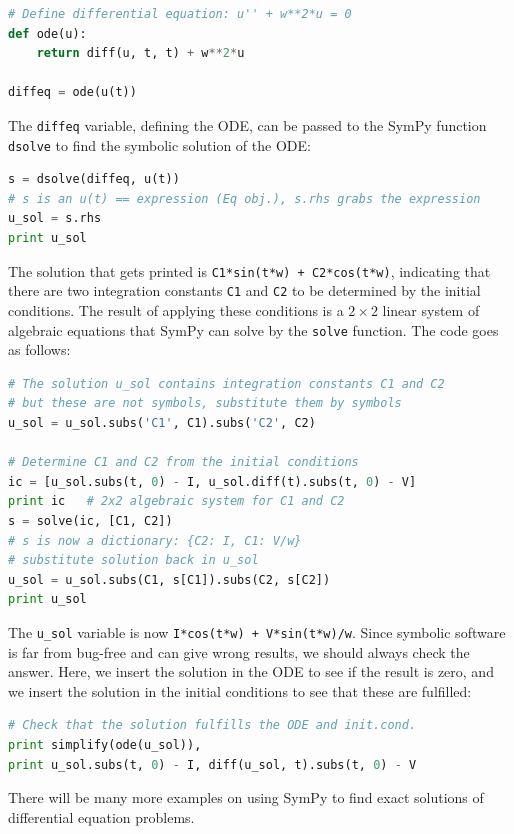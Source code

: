 \documentclass[graybox,envcountchap,sectrefs,final]{svmonodo}
\begin{document}
\begin{lstlisting}[language=Python,style=graycolor]
# Define differential equation: u'' + w**2*u = 0
def ode(u):
    return diff(u, t, t) + w**2*u

diffeq = ode(u(t))
\end{lstlisting}
The \texttt{diffeq} variable, defining the ODE, can be passed to the SymPy
function \texttt{dsolve} to find the symbolic solution of the ODE:

\begin{lstlisting}[language=Python,style=graycolor]
s = dsolve(diffeq, u(t))
# s is an u(t) == expression (Eq obj.), s.rhs grabs the expression
u_sol = s.rhs
print u_sol
\end{lstlisting}
The solution that gets printed is \texttt{C1*sin(t*w) + C2*cos(t*w)}, indicating
that there are two integration constants \texttt{C1} and \texttt{C2} to be determined
by the initial conditions. The result of applying these conditions is
a $2\times 2$ linear system of algebraic equations that SymPy can solve
by the \texttt{solve} function. The code goes as follows:

\begin{lstlisting}[language=Python,style=graycolor]
# The solution u_sol contains integration constants C1 and C2
# but these are not symbols, substitute them by symbols
u_sol = u_sol.subs('C1', C1).subs('C2', C2)

# Determine C1 and C2 from the initial conditions
ic = [u_sol.subs(t, 0) - I, u_sol.diff(t).subs(t, 0) - V]
print ic   # 2x2 algebraic system for C1 and C2
s = solve(ic, [C1, C2])
# s is now a dictionary: {C2: I, C1: V/w}
# substitute solution back in u_sol
u_sol = u_sol.subs(C1, s[C1]).subs(C2, s[C2])
print u_sol
\end{lstlisting}
The \Verb!u_sol! variable is now \texttt{I*cos(t*w) + V*sin(t*w)/w}.
Since symbolic software is far from bug-free and can give wrong results,
we should always check the answer. Here, we insert the solution in the ODE
to see if the result is zero, and we insert the solution in the initial
conditions to see that these are fulfilled:

\begin{lstlisting}[language=Python,style=graycolor]
# Check that the solution fulfills the ODE and init.cond.
print simplify(ode(u_sol)),
print u_sol.subs(t, 0) - I, diff(u_sol, t).subs(t, 0) - V
\end{lstlisting}
There will be many more examples on using SymPy to find exact solutions
of differential equation problems.
\end{document}
